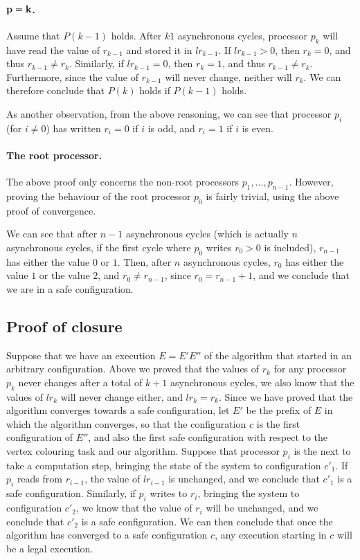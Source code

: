 \documentclass{article}
\begin{document}
\paragraph{$\bf p = k$.}
Assume that $P(k - 1)$ holds. After $k1$ asynchronous cycles, processor $p_k$ will have read the value of $r_{k - 1}$ and stored it in $lr_{k - 1}$. If $lr_{k - 1} > 0$, then $r_k = 0$, and thus $r_{k - 1} \neq r_k$. Similarly, if $lr_{k - 1} = 0$, then $r_k = 1$, and thus $r_{k - 1} \neq r_k$. Furthermore, since the value of $r_{k - 1}$ will never change, neither will $r_k$. We can therefore conclude that $P(k)$ holds if $P(k - 1)$ holds.

As another observation, from the above reasoning, we can see that processor $p_i$ (for $i \neq 0$) has written $r_i = 0$ if $i$ is odd, and $r_i = 1$ if $i$ is even.

\paragraph{The root processor.}
The above proof only concerns the non-root processors $p_1, \ldots, p_{n - 1}$. However, proving the behaviour of the root processor $p_0$ is fairly trivial, using the above proof of convergence.

We can see that after $n - 1$ asynchronous cycles (which is actually $n$ asynchronous cycles, if the first cycle where $p_0$ writes $r_0 > 0$ is included), $r_{n - 1}$ has either the value $0$ or $1$. Then, after $n$ asynchronous cycles, $r_0$ has either the value $1$ or the value $2$, and $r_0 \neq r_{n - 1}$, since $r_0 = r_{n - 1} + 1$, and we conclude that we are in a safe configuration.

\subsection*{Proof of closure}
Suppose that we have an execution $E = E'E''$ of the algorithm that started in an arbitrary configuration. Above we proved that the values of $r_k$ for any processor $p_k$ never changes after a total of $k + 1$ asynchronous cycles, we also know that the values of $lr_{k}$ will never change either, and $lr_k = r_k$. Since we have proved that the algorithm converges towards a safe configuration, let $E'$ be the prefix of $E$ in which the algorithm converges, so that the configuration $c$ is the first configuration of $E''$, and also the first safe configuration with respect to the vertex colouring task and our algorithm. Suppose that processor $p_i$ is the next to take a computation step, bringing the state of the system to configuration $c'_1$. If $p_i$ reads from $r_{i - 1}$, the value of $lr_{i - 1}$ is unchanged, and we conclude that $c'_1$ is a safe configuration. Similarly, if $p_i$ writes to $r_i$, bringing the system to configuration $c'_2$, we know that the value of $r_i$ will be unchanged, and we conclude that $c'_2$ is a safe configuration. We can then conclude that once the algorithm has converged to a safe configuration $c$, any execution starting in $c$ will be a legal execution.
\end{document}
